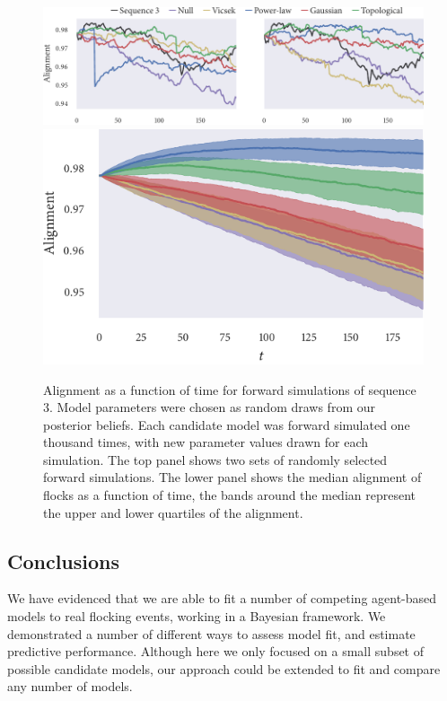 \begin{figure}[tbp]
  \includegraphics{alignment/alignment_single_3.pdf}\vspace{1em}\\
  \includegraphics{alignment/alignment_ensemble_3.pdf}
  \caption{Alignment as a function of time for forward simulations of sequence
    $3$. Model parameters were chosen as random draws from our posterior
    beliefs. Each candidate model was forward simulated one thousand times,
    with new parameter values drawn for each simulation. The top panel shows two
    sets of randomly selected forward simulations. The lower panel shows the
    median alignment of flocks as a function of time, the bands around the
    median represent the upper and lower quartiles of the alignment.}
  \label{fig:checks_seq3}
\end{figure}

\subsection*{Conclusions}

We have evidenced that we are able to fit a number of competing agent-based
models to real flocking events, working in a Bayesian framework. We
demonstrated a number of different ways to assess model fit, and estimate
predictive performance. Although here we only focused on a small subset of
possible candidate models, our approach could be extended to fit and compare
any number of models.

